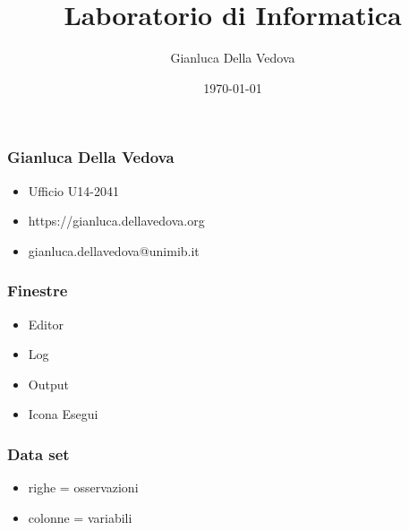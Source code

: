 \documentclass[aspectratio=169]{beamer}
\author{Gianluca Della Vedova}
\title{Laboratorio di Informatica}
\institute{Univ. Milano--Bicocca\\
  \texttt{https://gianluca.dellavedova.org}}
\date{\today}
\begin{document}
\begin{frame}
  \titlepage
\end{frame}


\begin{frame}\frametitle{Gianluca Della Vedova}
  \begin{itemize}
  \item
    Ufficio U14-2041
  \item
    \textsf{\small https://gianluca.dellavedova.org}
  \item
    \textsf{\small gianluca.dellavedova@unimib.it}
  \end{itemize}
\end{frame}





\begin{frame}\frametitle{Finestre}
  \begin{itemize}
  \item
    Editor
  \item
    Log
  \item
    Output
  \item
    Icona Esegui
  \end{itemize}
\end{frame}

\begin{frame}\frametitle{Data set}
  \begin{itemize}
  \item
    righe = osservazioni
  \item
    colonne = variabili
  \end{itemize}
\end{frame}
\end{document}
